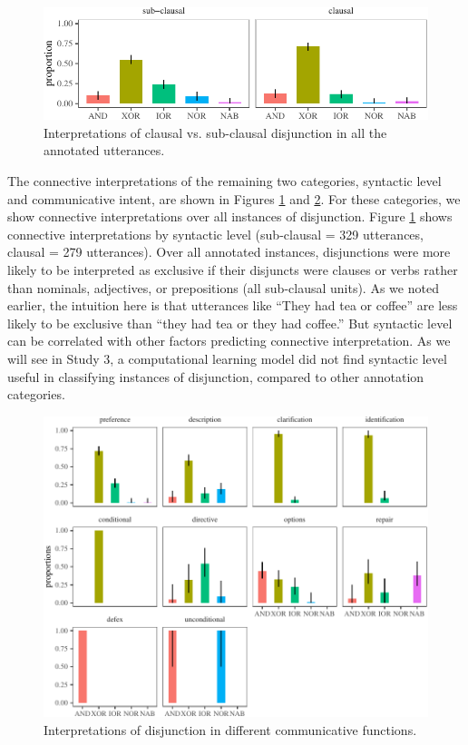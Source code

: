 \documentclass[
  ,man,floatsintext]{apa6}
\begin{document}
\begin{figure}[H]

{\centering \includegraphics{figs/syntaxPlot-1} 

}

\caption{Interpretations of clausal vs. sub-clausal disjunction in all the annotated utterances.}\label{fig:syntaxPlot}
\end{figure}

The connective interpretations of the remaining two categories, syntactic level and communicative intent, are shown in Figures \ref{fig:syntaxPlot} and \ref{fig:speechActPlot}. For these categories, we show connective interpretations over all instances of disjunction. Figure \ref{fig:syntaxPlot} shows connective interpretations by syntactic level (sub-clausal = 329 utterances, clausal = 279 utterances). Over all annotated instances, disjunctions were more likely to be interpreted as exclusive if their disjuncts were clauses or verbs rather than nominals, adjectives, or prepositions (all sub-clausal units). As we noted earlier, the intuition here is that utterances like ``They had tea or coffee'' are less likely to be exclusive than ``they had tea or they had coffee.'' But syntactic level can be correlated with other factors predicting connective interpretation. As we will see in Study 3, a computational learning model did not find syntactic level useful in classifying instances of disjunction, compared to other annotation categories.

\begin{figure}[H]

{\centering \includegraphics{figs/speechActPlot-1} 

}

\caption{Interpretations of disjunction in different communicative functions.}\label{fig:speechActPlot}
\end{figure}
\end{document}
